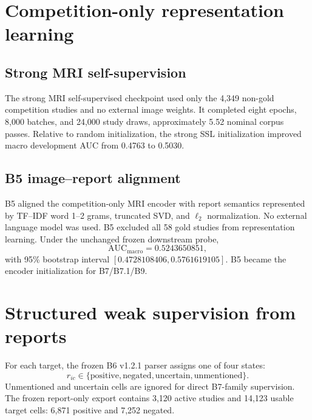 \documentclass[preprint,12pt]{elsarticle}
\begin{document}
\section{Competition-only representation learning}
\label{sec:representation}

\subsection{Strong MRI self-supervision}
The strong MRI self-supervised checkpoint used only the 4,349 non-gold competition studies and no external image weights. It completed eight epochs, 8,000 batches, and 24,000 study draws, approximately 5.52 nominal corpus passes. Relative to random initialization, the strong SSL initialization improved macro development AUC from 0.4763 to 0.5030.

\subsection{B5 image--report alignment}
B5 aligned the competition-only MRI encoder with report semantics represented by TF--IDF word 1--2 grams, truncated SVD, and $\ell_2$ normalization. No external language model was used. B5 excluded all 58 gold studies from representation learning. Under the unchanged frozen downstream probe,
\begin{equation}
\mathrm{AUC}_{\mathrm{macro}}=0.5243650851,
\end{equation}
with 95\% bootstrap interval $[0.4728108406,0.5761619105]$. B5 became the encoder initialization for B7/B7.1/B9.

\section{Structured weak supervision from reports}
\label{sec:reports}

For each target, the frozen B6 v1.2.1 parser assigns one of four states:
\begin{equation}
r_{ic}\in\{\mathrm{positive},\mathrm{negated},\mathrm{uncertain},\mathrm{unmentioned}\}.
\end{equation}
Unmentioned and uncertain cells are ignored for direct B7-family supervision. The frozen report-only export contains 3,120 active studies and 14,123 usable target cells: 6,871 positive and 7,252 negated.
\end{document}
